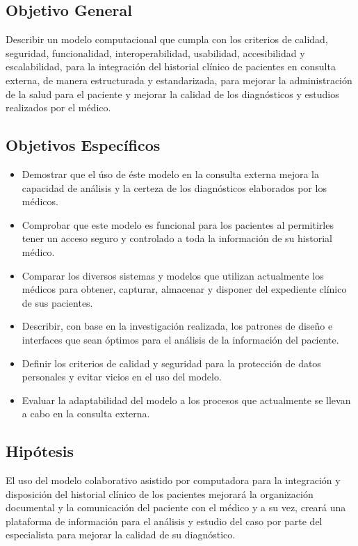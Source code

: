     \subsection{Objetivo General}    
    Describir un modelo computacional que cumpla con los criterios de calidad, seguridad, funcionalidad, interoperabilidad, usabilidad, accesibilidad y escalabilidad, para la integración del historial clínico de pacientes en consulta externa, de manera estructurada y estandarizada, para mejorar la administración de la salud para el paciente y mejorar la calidad de los diagnósticos y estudios realizados por el médico.
    \subsection{Objetivos Específicos}
    \begin{itemize}
        \item Demostrar que el úso de éste modelo en la consulta externa mejora la capacidad de análisis y la certeza de los diagnósticos elaborados por los médicos.
        
        \item Comprobar que este modelo es funcional para los pacientes al permitirles tener un acceso seguro y controlado a toda la información de su historial médico.
        
        \item Comparar los diversos sistemas y modelos que utilizan actualmente los médicos para obtener, capturar, almacenar y disponer del expediente clínico de sus pacientes.
        
        \item Describir, con base en la investigación realizada, los patrones de diseño e interfaces que sean óptimos para el análisis de la información del paciente.
        
        \item Definir los criterios de calidad y seguridad para la protección de datos personales y evitar vicios en el uso del modelo.
        
        \item Evaluar la adaptabilidad del modelo a los procesos que actualmente se llevan a cabo en la consulta externa.
    \end{itemize}
    \subsection{Hipótesis}
    El uso del modelo colaborativo asistido por computadora para la integración y disposición del historial clínico de los pacientes mejorará la organización documental y la comunicación del paciente con el médico y a su vez, creará una plataforma de información para el análisis y estudio del caso por parte del especialista para mejorar la calidad de su diagnóstico.